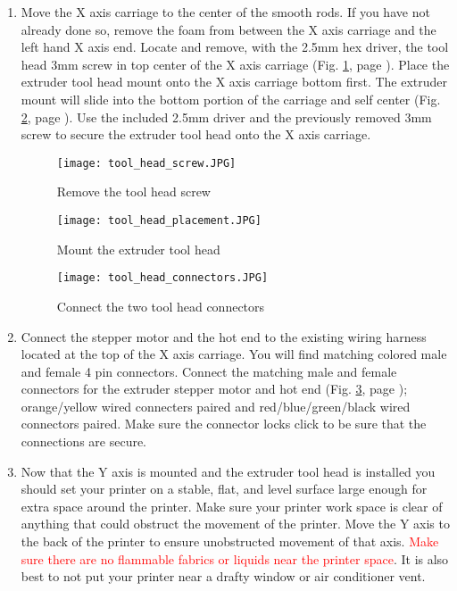 \begin{enumerate}
\item Move the X axis carriage to the center of the smooth rods. If you have not already done so, remove the foam from between the X axis carriage and the left hand X axis end. Locate and remove, with the 2.5mm hex driver, the tool head 3mm screw in top center of the X axis carriage (Fig. \ref{fig:tool_head_screw}, page \pageref{fig:tool_head_screw}). Place the extruder tool head mount onto the X axis carriage bottom first. The extruder mount will slide into the bottom portion of the carriage and self center (Fig. \ref{fig:tool_head_placement}, page \pageref{fig:tool_head_placement}). Use the included 2.5mm driver and the previously removed 3mm screw to secure the extruder tool head onto the X axis carriage.
\begin{figure}[hp]
\centering
\texttt{[image: tool\_head\_screw.JPG]}
\caption{Remove the tool head screw}
\label{fig:tool_head_screw}
\end{figure}

\begin{figure}[hp]
\centering
\texttt{[image: tool\_head\_placement.JPG]}
\caption{Mount the extruder tool head}
\label{fig:tool_head_placement}
\end{figure}

\begin{figure}[hp]
\centering
\texttt{[image: tool\_head\_connectors.JPG]}
\caption{Connect the two tool head connectors}
\label{fig:tool_head_connectors}
\end{figure}

\item Connect the stepper motor and the hot end to the existing wiring harness located at the top of the X axis carriage. You will find matching colored male and female 4 pin connectors. Connect the matching male and female connectors for the extruder stepper motor and hot end (Fig. \ref{fig:tool_head_connectors}, page \pageref{fig:tool_head_connectors}); orange/yellow wired connecters paired and red/blue/green/black wired connectors paired. Make sure the connector locks click to be sure that the connections are secure.

\item Now that the Y axis is mounted and the extruder tool head is installed you should set your printer on a stable, flat, and level surface large enough for extra space around the printer. Make sure your printer work space is clear of anything that could obstruct the movement of the printer. Move the Y axis to the back of the printer to ensure unobstructed movement of that axis. \textcolor{red}{Make sure there are no flammable fabrics or liquids near the printer space}. It is also best to not put your printer near a drafty window or air conditioner vent.


\end{enumerate}
